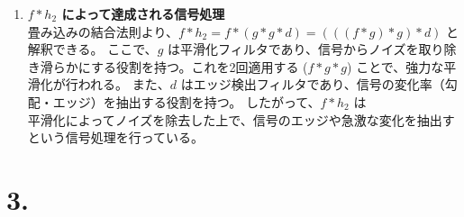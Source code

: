 \documentclass[11pt,a4paper]{jlreq}
\begin{document}
\begin{enumerate}
    \item[(C)] \textbf{\boldmath $f * h_2$ によって達成される信号処理} \\
畳み込みの結合法則より、$f * h_2 = f * (g * g * d) = (((f * g) * g) * d)$ と解釈できる。
ここで、$g$ は平滑化フィルタであり、信号からノイズを取り除き滑らかにする役割を持つ。これを2回適用する ($f * g * g$) ことで、強力な平滑化が行われる。
また、$d$ はエッジ検出フィルタであり、信号の変化率（勾配・エッジ）を抽出する役割を持つ。
したがって、$f * h_2$ は$\boxed{\text{平滑化によってノイズを除去した上で、信号のエッジや急激な変化を抽出する}}$という信号処理を行っている。
\end{enumerate}

\section*{3.}
\end{document}
